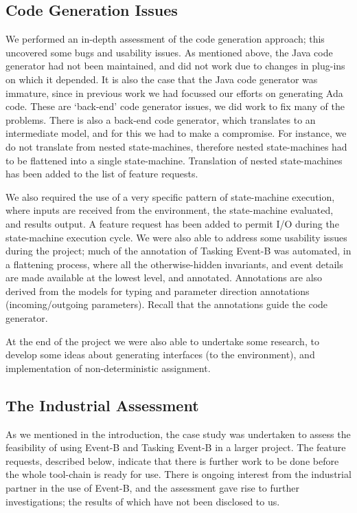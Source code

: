 \documentclass{llncs}%
\begin{document}
\subsection{Code Generation Issues}
We performed an in-depth assessment of the code generation approach; this uncovered some bugs and usability issues. As mentioned above, the Java code generator had not been maintained, and did not work due to changes in plug-ins on which it depended. It is also the case that the Java code generator was immature, since in previous work we had focussed our efforts on generating Ada code. These are `back-end' code generator issues, we did work to fix many of the problems. There is also a back-end code generator, which translates to an intermediate model, and for this we had to make a compromise. For instance, we do not translate from nested state-machines, therefore nested state-machines had to be flattened into a single state-machine. Translation of nested state-machines has been added to the list of feature requests. 

We also required the use of a very specific pattern of state-machine execution, where inputs are received from the environment, the state-machine evaluated, and results output. A feature request has been added to permit I/O during the state-machine execution cycle. We were also able to address some usability issues during the project; much of the annotation of Tasking Event-B was automated, in a flattening process, where all the otherwise-hidden invariants, and event details are made available at the lowest level, and annotated. Annotations are also derived from the models for typing and parameter direction annotations (incoming/outgoing parameters). Recall that the annotations guide the code generator.  

At the end of the project we were also able to undertake some research, to develop some ideas about generating interfaces (to the environment), and implementation of non-deterministic assignment. 
%
\subsection{The Industrial Assessment}
As we mentioned in the introduction, the case study was undertaken to assess the feasibility of using Event-B and Tasking Event-B in a larger project. The feature requests, described below, indicate that there is further work to be done before the whole tool-chain is ready for use. There is ongoing interest from the industrial partner in the use of Event-B, and the assessment gave rise to further investigations; the results of which have not been disclosed to us.
\end{document}
